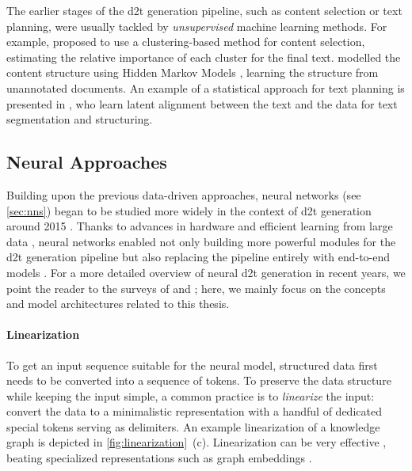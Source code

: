 {The earlier stages of the \ac{d2t} generation pipeline, such as content selection or text planning, were usually tackled by \emph{unsupervised} machine learning methods. For example, \citet{duboue2003statistical} proposed to use a clustering-based method for content selection, estimating the relative importance of each cluster for the final text. \citet{barzilay2004catching} modelled the content structure using Hidden Markov Models \cite{baum1966statistical}, learning the structure from unannotated documents. An example of a statistical approach for text planning is presented in \citet{liang2009learning}, who learn latent alignment between the text and the data for text segmentation and structuring.

\subsection{Neural Approaches}
\label{sec:neural-d2t}
Building upon the previous data-driven approaches, neural networks (see \autoref{sec:nns}) began to be studied more widely in the context of \ac{d2t} generation around 2015 \cite{wen2015toward,dusekSequencetoSequenceGenerationSpoken2016}. Thanks to advances in hardware \cite{hooker2021hardware} and efficient learning from large data \cite{lecun2015deep}, neural networks enabled not only building more powerful modules for the \ac{d2t} generation pipeline but also replacing the pipeline entirely with end-to-end models \cite{dusekEvaluatingStateoftheartEndtoEnd2020}. For a more detailed overview of neural \ac{d2t} generation in recent years, we point the reader to the surveys of \citet{sharmaInnovationsNeuralDatatotext2022} and \citet{lin2023survey}; here, we mainly focus on the concepts and model architectures related to this thesis.


\paragraph{Linearization} To get an input sequence suitable for the neural model, structured data first needs to be converted into a sequence of tokens. To preserve the data structure while keeping the input simple, a common practice is to \emph{linearize} the input: convert the data to a minimalistic representation with a handful of dedicated special tokens serving as delimiters. An example linearization of a knowledge graph is depicted in \autoref{fig:linearization}~(c). Linearization can be very effective \cite{yang2020improving,hoyle2021promoting,xieUnifiedSKGUnifyingMultiTasking2022}, beating specialized representations such as graph embeddings \cite{marcheggianiDeepGraphConvolutional2018,koncel-kedziorskiTextGenerationKnowledge2019}.

}

